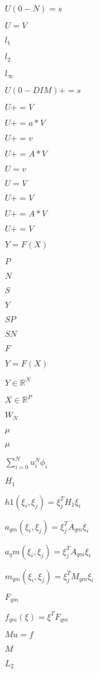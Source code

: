 \documentclass{article}
\begin{document}
$U(0-N) = s$
\pagebreak

$U = V$
\pagebreak

$l_1$
\pagebreak

$l_2$
\pagebreak

$l_\infty$
\pagebreak

$U(0-DIM)+=s$
\pagebreak

$U+=V$
\pagebreak

$U+=a*V$
\pagebreak

$ U+=v $
\pagebreak

$U+=A*V$
\pagebreak

$ U=v $
\pagebreak

$U=V$
\pagebreak

$ U+=V $
\pagebreak

$ U+=A*V$
\pagebreak

$U+=V $
\pagebreak

$ Y=F(X) $
\pagebreak

$ P$
\pagebreak

$ N$
\pagebreak

$ S $
\pagebreak

$ Y$
\pagebreak

$ S P$
\pagebreak

$ S N $
\pagebreak

$ F $
\pagebreak

$ Y = F(X) $
\pagebreak

$ Y \in \mathbb{R}^N$
\pagebreak

$ X \in \mathbb{R}^P$
\pagebreak

$W_N$
\pagebreak

$ \mu$
\pagebreak

$\mu$
\pagebreak

$\sum_{i=0}^N u^N_i \phi_i$
\pagebreak

$H_1$
\pagebreak

$h1(\xi_i, \xi_j) = \xi_j^T H_1 \xi_i$
\pagebreak

$a_{qm}(\xi_i, \xi_j) = \xi_j^T A_{qm} \xi_i$
\pagebreak

$a_qm(\xi_i, \xi_j) = \xi_j^T A_{qm} \xi_i$
\pagebreak

$m_{qm}(\xi_i, \xi_j) = \xi_j^T M_{qm} \xi_i$
\pagebreak

$F_{qm}$
\pagebreak

$f_{qm}(\xi) = \xi^T F_{qm} $
\pagebreak

$M u = f$
\pagebreak

$ M $
\pagebreak

$ L_2 $
\pagebreak
\end{document}
